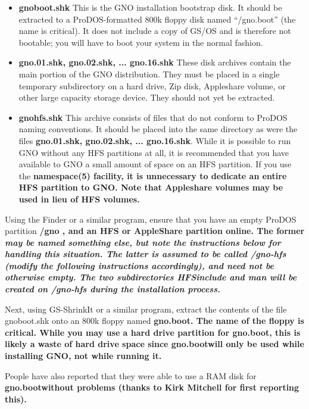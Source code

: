 \documentclass{report}
\begin{document}
\begin{itemize}

\item{\bf gnoboot.shk\rm}
This is the GNO installation bootstrap disk.  It should be extracted to
a ProDOS-formatted 800k floppy disk named ``/gno.boot'' (the name is
critical).  It does not include a copy of GS/OS and is
therefore not bootable; you will have to boot your system in the normal
fashion.

\item{\bf gno.01.shk\rm, \bf gno.02.shk\rm, ... \bf gno.16.shk\rm}
These disk archives contain the main portion of the GNO distribution.
They must be placed in a single temporary subdirectory on a hard drive,
Zip disk, Appleshare volume, or other large capacity storage device.
They should not yet be extracted.

\item{\bf gnohfs.shk\rm}
This archive consists of files that do not conform to ProDOS naming 
conventions.
It should be placed into the same directory as were the files
{\bf gno.01.shk\rm, \bf gno.02.shk\rm, ... \bf gno.16.shk\rm}.
While it is possible to run GNO without any HFS partitions
at all, it is recommended that you have available to GNO a small amount
of space on an HFS partition.  If you use the \bf namespace\rm(5) facility,
it is unnecessary to dedicate an entire HFS partition to GNO.
Note that Appleshare volumes may be used in lieu of HFS volumes.

\end{itemize}

Using the Finder or a similar program, ensure that you have an empty ProDOS 
partition \bf /gno \rm, and an HFS or AppleShare partition online.  The
former \em may \rm  be named something else, but note the instructions
below for handling this situation.  The latter is assumed to be called
\bf /gno-hfs \rm  (modify the following instructions accordingly), and
need not be otherwise empty.  The two subdirectories \bf HFSinclude \rm
and \bf man \rm  will be created on \bf /gno-hfs  \rm during the installation
process.

Next, using GS-ShrinkIt or a similar program, extract the contents of the
file gnoboot.shk onto an 800k floppy named \bf gno.boot\rm.  
The name of the floppy is critical.  While you may use a hard drive 
partition for \bf gno.boot\rm, this is likely a waste of hard drive space
since \bf gno.boot\rm  will only be used while installing GNO, not while
running it.

People have also reported that they were able to use a RAM disk for
\bf gno.boot\rm  without problems (thanks to Kirk Mitchell for first
reporting this).
\end{document}
